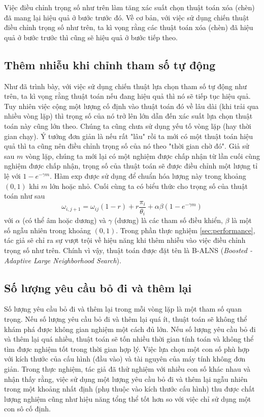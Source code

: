 Việc điều chỉnh trọng số như trên làm tăng xác suất chọn thuật toán xóa (chèn) đã mang lại hiệu quả ở bước trước đó. Về cơ bản, với việc sử dụng chiến thuật điều chỉnh trọng số như trên, ta kì vọng rằng các thuật toán xóa (chèn) đã hiệu quả ở bước trước thì cũng sẽ hiệu quả ở bước tiếp theo.

\subsection{Thêm nhiễu khi chỉnh tham số tự động}
Như đã trình bày, với việc sử dụng chiến thuật lựa chọn tham số tự động như trên, ta kì vọng rằng thuật toán nếu đang hiệu quả thì nó sẽ tiếp tục hiệu quả. Tuy nhiên việc cộng một lượng cố định vào thuật toán đó về lâu dài (khi trải qua nhiều vòng lặp) thì trọng số của nó trở lên lớn dẫn đến xác suất lựa chọn thuật toán này cũng lớn theo. Chúng ta cũng chưa sử dụng yếu tố vòng lặp (hay thời gian chạy). Ý tưởng đơn giản là nếu rất "lâu" rồi ta mới có một thuật toán hiệu quả thì ta cũng nên điều chỉnh trọng số của nó theo "thời gian chờ đó". Giả sử sau $m$ vòng lặp, chúng ta mới lại có một nghiệm được chấp nhận từ lần cuối cùng nghiệm được chấp nhận, trọng số của thuật toán sẽ được điều chỉnh một lượng tỉ lệ với $1 - e^{-\gamma m}$. Hàm $\text{exp}$ được sử dụng để chuẩn hóa lượng này trong khoảng $(0,1)$ khi $m$ lớn hoặc nhỏ. Cuối cùng ta có biểu thức cho trọng số của thuật toán như sau
\begin{equation}
	\label{eq:boost_adaptive_weight}
	\omega_{i, j+1} = \omega_{ij}(1-r)+r\frac{\pi_i} {\theta_i} + \alpha \beta (1 - e^{-\gamma m})
\end{equation}
với $\alpha$ (có thể âm hoặc dương) và $\gamma$ (dương) là các tham số điều khiển, $\beta$ là một số ngẫu nhiên trong khoảng $(0,1)$. Trong phần thực nghiệm \ref{sec:performance}, tác giả sẽ chỉ ra sự vượt trội về hiệu năng khi thêm nhiễu vào việc điều chỉnh trọng số như trên. Chính vì vậy, thuật toán được đặt tên là B-ALNS (\textit{Boosted - Adaptive Large Neighborhood Search}).

\subsection{Số lượng yêu cầu bỏ đi và thêm lại}
\label{sec:num_rm_req}
Số lượng yêu cầu bỏ đi và thêm lại trong mỗi vòng lặp là một tham số quan trọng. Nếu số lượng yêu cầu bỏ đi và thêm lại quá ít, thuật toán sẽ không thể khám phá được không gian nghiệm một cách đủ lớn. Nếu số lượng yêu cầu bỏ đi và thêm lại quá nhiều, thuật toán sẽ tốn nhiều thời gian tính toán và không thể tìm được nghiệm tốt trong thời gian hợp lý. Việc lựa chọn một con số phù hợp với kích thước của cấu hình (đầu vào) và tài nguyên của máy tính không đơn giản. Trong thực nghiệm, tác giả đã thử nghiệm với nhiều con số khác nhau và nhận thấy rằng, việc sử dụng một lượng yêu cầu bỏ đi và thêm lại ngẫu nhiên trong một khoảng nhất định (phụ thuộc vào kích thước cấu hình) thu được chất lượng nghiệm cũng như hiệu năng tổng thể tốt hơn so với việc chỉ sử dụng một con sô cố định.